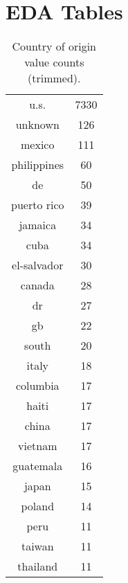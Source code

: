 \section{EDA Tables}

\begin{table}[!h]
\begin{minipage}{.3\textwidth}
    \caption{Country of origin value counts (trimmed).}
    \label{tab:contry_of_origin_value_counts}
    \centering
    \begin{tabular}{cc}
        u.s. & 7330 \\
        unknown & 126 \\
        mexico & 111 \\
        philippines & 60 \\
        de & 50 \\
        puerto rico & 39 \\
        jamaica & 34 \\
        cuba & 34 \\
        el-salvador & 30 \\
        canada & 28 \\
        dr & 27 \\
        gb & 22 \\
        south & 20 \\
        italy & 18 \\
        columbia & 17 \\
        haiti & 17 \\
        china & 17 \\
        vietnam & 17 \\
        guatemala & 16 \\
        japan & 15 \\
        poland & 14 \\
        peru & 11 \\
        taiwan & 11 \\
        thailand & 11 \\

\end{tabular}
\end{minipage}
\end{table}
